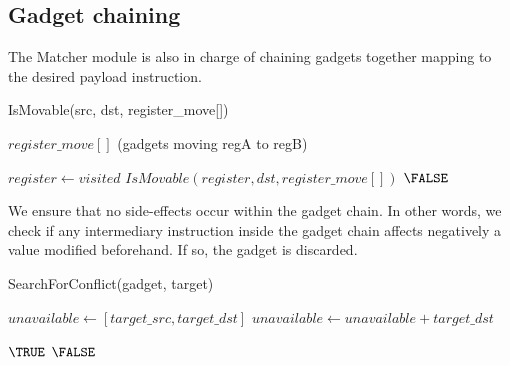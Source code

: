 \documentclass[10pt,twocolumn]{article}
\begin{document}
\subsection{Gadget chaining}

The Matcher module is also in charge of chaining gadgets together mapping to
the desired payload instruction. 

\begin{algorithm}
    \caption{IsMovable(src, dst, register\_move[])}
    \begin{algorithmic}[1] 
        \REQUIRE $register\_move[]$ (gadgets moving regA to regB)
        
                        \RETURN \TRUE
                        \ENDIF
                    \ENDIF
                \ENDFOR
            \ENDIF
        \ENDFOR

                \STATE $register \leftarrow visited$
                        \RETURN $IsMovable(register, dst, register\_move[])$
                        \ENDIF
                    \ENDIF
                \ENDFOR
            \ENDIF
        \ENDFOR
        \RETURN $\FALSE$

    \end{algorithmic}
\end{algorithm}

We ensure that no side-effects occur within the gadget chain. In other words,
we check if any intermediary instruction inside the gadget chain affects
negatively a value modified beforehand. If so, the gadget is discarded.

\begin{algorithm}
    \caption{SearchForConflict(gadget, target)}
    \begin{algorithmic}[1]
        \STATE $unavailable \leftarrow [target\_src, target\_dst]$
            \STATE $unavailable \leftarrow unavailable + target\_dst$
        \ENDIF
        
            \RETURN $\TRUE$
            \ENDIF
        \ENDFOR
        \RETURN $\FALSE$
    \end{algorithmic}
\end{algorithm}
\end{document}
